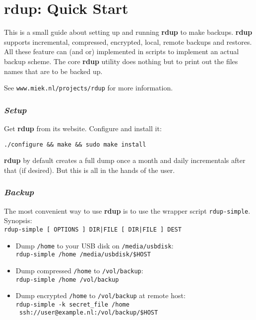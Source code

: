 \documentclass[a4paper, openany]{blocksbook}
\newcommand{\rdup}{\textbf{rdup}}
\newcommand{\cmd}[1]{\texttt{#1}}
\newcommand{\url}[1]{\texttt{#1}}
\newcommand{\path}[1]{\texttt{#1}}
\begin{document}
\chapter*{\rdup: Quick Start}
This is a small guide about setting up and running \rdup{} to make
backups. \rdup{}
supports incremental, compressed, encrypted, local, remote  backups and
restores. All these feature can (and or) implemented in scripts to
implement an actual backup scheme. The core \rdup{} utility does
nothing but to print out the files names that are to be backed up.

See \url{www.miek.nl/projects/rdup} for more information.

\subsection*{\textit{Setup}}
Get \rdup{} from its website. Configure and install it:
\begin{verbatim}
./configure && make && sudo make install
\end{verbatim}
\rdup{} by default creates a full dump once a month and 
daily incrementals after that (if desired). But this is
all in the hands of the user.

\subsection*{\textit{Backup}}
The most convenient way to use \rdup{} is to use the wrapper
script \cmd{rdup-simple}. Synopsis:\\
\cmd{rdup-simple [ OPTIONS ] DIR|FILE [ DIR|FILE ] DEST} 
\begin{itemize}
\item
Dump \path{/home} to your USB disk on \path{/media/usbdisk}:\\
\cmd{rdup-simple /home /media/usbdisk/\$HOST}
\item
Dump compressed \path{/home} to \path{/vol/backup}:\\
\cmd{rdup-simple /home /vol/backup} 
\item
Dump encrypted \path{/home} to \path{/vol/backup} at remote
host:\\
\cmd{rdup-simple -k secret\_file /home \\\
ssh://user@example.nl:/vol/backup/\$HOST}
\end{itemize}
\end{document}
